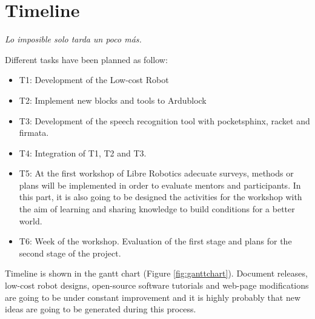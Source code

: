 \chapter{Timeline}
    
 \vspace{1mm}
 \footnotesize {
 \begin{flushright}
 \textit{Lo imposible solo tarda un poco m\'as.
 }
 \end{flushright}
 }
\vspace{5mm} 

Different tasks have been planned as follow:
\begin{itemize}[noitemsep,topsep=0pt,parsep=0pt,partopsep=0pt]
\item T1: Development of the Low-cost Robot
\item T2: Implement new blocks and tools to Ardublock 
\item T3: Development of the speech recognition tool with pocketsphinx, racket and firmata.
\item T4: Integration of T1, T2 and T3.
\item T5: At the first workshop of Libre Robotics adecuate surveys, methods or plans will 
	  be implemented in order to evaluate mentors and participants. In this part, it 
	  is also going to be designed the activities for the workshop with the aim of 
	  learning and sharing knowledge to build conditions for a better world.
\item T6: Week of the workshop. Evaluation of the first stage and plans for the second stage of the project.
\end{itemize}

Timeline is shown in the gantt chart (Figure \ref{fig:ganttchart}).
Document releases, low-cost robot designs, open-source software tutorials and 
web-page modifications are going to be under constant improvement and 
it is highly probably that new ideas are going to be generated during this process.


